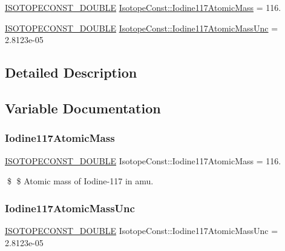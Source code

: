 \begin{DoxyCompactItemize}
\item 
\mbox{\hyperlink{group___isotope_const-_macros_ga8f45a7272ce02c0b4c65c44636ed719a}{I\+S\+O\+T\+O\+P\+E\+C\+O\+N\+S\+T\+\_\+\+D\+O\+U\+B\+LE}} \mbox{\hyperlink{group___isotope_const-_iodine-_i117_gabbe5f986d55b8f5780c60a852d3b0d8e}{Isotope\+Const\+::\+Iodine117\+Atomic\+Mass}} = 116.
\item 
\mbox{\hyperlink{group___isotope_const-_macros_ga8f45a7272ce02c0b4c65c44636ed719a}{I\+S\+O\+T\+O\+P\+E\+C\+O\+N\+S\+T\+\_\+\+D\+O\+U\+B\+LE}} \mbox{\hyperlink{group___isotope_const-_iodine-_i117_gabc6b53cd117dc0c9a3e9ac32b648285e}{Isotope\+Const\+::\+Iodine117\+Atomic\+Mass\+Unc}} = 2.\+8123e-\/05
\end{DoxyCompactItemize}


\subsection{Detailed Description}


\subsection{Variable Documentation}
\mbox{\label{group___isotope_const-_iodine-_i117_gabbe5f986d55b8f5780c60a852d3b0d8e}} 
\subsubsection{\texorpdfstring{Iodine117\+Atomic\+Mass}{Iodine117AtomicMass}}
{\footnotesize\ttfamily \mbox{\hyperlink{group___isotope_const-_macros_ga8f45a7272ce02c0b4c65c44636ed719a}{I\+S\+O\+T\+O\+P\+E\+C\+O\+N\+S\+T\+\_\+\+D\+O\+U\+B\+LE}} Isotope\+Const\+::\+Iodine117\+Atomic\+Mass = 116.}

\$ \$ Atomic mass of Iodine-\/117 in amu. \mbox{\label{group___isotope_const-_iodine-_i117_gabc6b53cd117dc0c9a3e9ac32b648285e}} 
\subsubsection{\texorpdfstring{Iodine117\+Atomic\+Mass\+Unc}{Iodine117AtomicMassUnc}}
{\footnotesize\ttfamily \mbox{\hyperlink{group___isotope_const-_macros_ga8f45a7272ce02c0b4c65c44636ed719a}{I\+S\+O\+T\+O\+P\+E\+C\+O\+N\+S\+T\+\_\+\+D\+O\+U\+B\+LE}} Isotope\+Const\+::\+Iodine117\+Atomic\+Mass\+Unc = 2.\+8123e-\/05}

